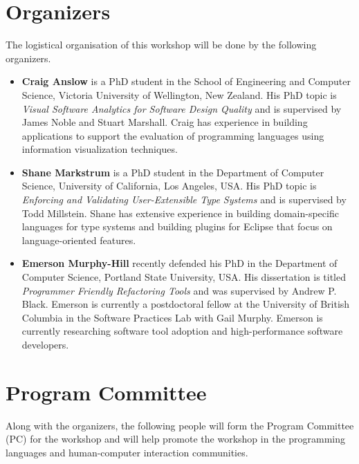 \documentclass{acm_proc_article-sp}
\begin{document}
\section{Organizers}

The logistical organisation of this workshop will be done by the following organizers.

\begin{itemize}
\item \textbf{Craig Anslow} is a PhD student in the School of
  Engineering and Computer Science, Victoria University of Wellington,
  New Zealand. His PhD topic is \emph{Visual Software Analytics for
    Software Design Quality} and is supervised by James Noble and
  Stuart Marshall. Craig has experience in building applications to
  support the evaluation of programming languages using information
  visualization techniques.

\item \textbf{Shane Markstrum} is a PhD student in the Department of
  Computer Science, University of California, Los Angeles, USA. His
  PhD topic is \emph{Enforcing and Validating User-Extensible Type
    Systems} and is supervised by Todd Millstein. Shane has extensive
  experience in building domain-specific languages for type systems
  and building plugins for Eclipse that focus on language-oriented
  features.

\item \textbf{Emerson Murphy-Hill} recently defended his PhD in the
  Department of Computer Science, Portland State University, USA. His
  dissertation is titled \emph{Programmer Friendly Refactoring Tools}
  and was supervised by Andrew P. Black. Emerson is currently a
  postdoctoral fellow at the
  University of British Columbia in the Software Practices Lab with
  Gail Murphy.
  Emerson is currently researching software tool adoption and
  high-performance software developers.
\end{itemize}

\section{Program Committee}

Along with the organizers, the following people will form the Program
Committee (PC) for the workshop and will help promote the workshop in
the programming languages and human-computer interaction communities.
\end{document}
